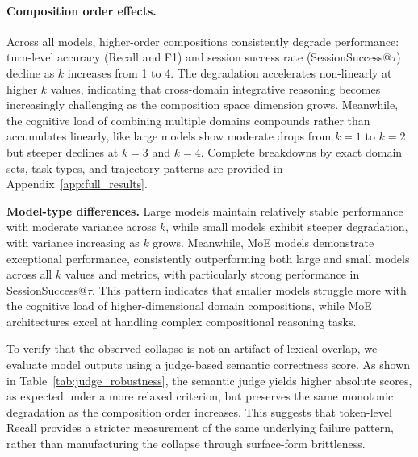\paragraph{Composition order effects.}
Across all models, higher-order compositions consistently degrade performance: turn-level accuracy (Recall and F1) and session success rate (SessionSuccess@$\tau$) decline as $k$ increases from 1 to 4.
The degradation accelerates non-linearly at higher $k$ values, indicating that cross-domain integrative reasoning becomes increasingly challenging as the composition space dimension grows.
Meanwhile, the cognitive load of combining multiple domains compounds rather than accumulates linearly, like large models show moderate drops from $k=1$ to $k=2$ but steeper declines at $k=3$ and $k=4$.
Complete breakdowns by exact domain sets, task types, and trajectory patterns are provided in Appendix~\ref{app:full_results}.

\textbf{Model-type differences.}
Large models maintain relatively stable performance with moderate variance across $k$, while small models exhibit steeper degradation, with variance increasing as $k$ grows.
Meanwhile, MoE models demonstrate exceptional performance, consistently outperforming both large and small models across all $k$ values and metrics, with particularly strong performance in SessionSuccess@$\tau$.
This pattern indicates that smaller models struggle more with the cognitive load of higher-dimensional domain compositions, while MoE architectures excel at handling complex compositional reasoning tasks.

\begin{table}[t]
\centering
\caption{Semantic-evaluation robustness under increasing composition order,
showing judge-based evaluation preserves the same degradation trend as token-level Recall.}
\label{tab:judge_robustness}
\vspace{-1mm}
\end{table}

To verify that the observed collapse is not an artifact of lexical overlap, 
we evaluate model outputs using a judge-based semantic correctness score.
As shown in Table~\ref{tab:judge_robustness}, the semantic judge yields higher absolute scores, 
as expected under a more relaxed criterion, but preserves the same monotonic degradation as the composition order increases.
This suggests that token-level Recall provides a stricter measurement of the same underlying failure pattern, 
rather than manufacturing the collapse through surface-form brittleness.

